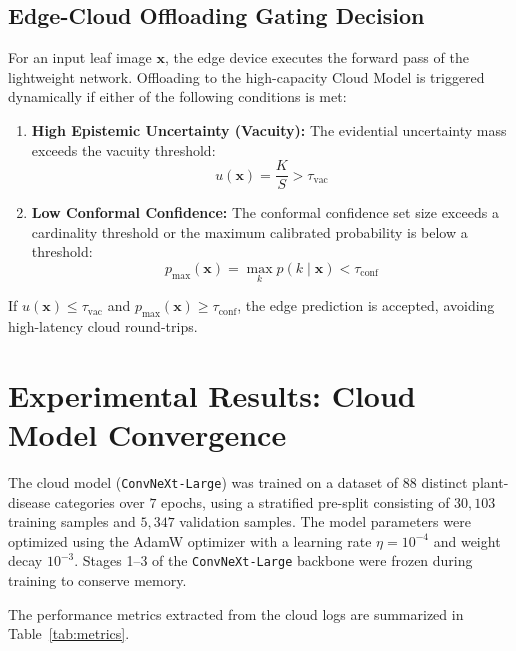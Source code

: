\documentclass[11pt,journal,onecolumn]{IEEEtran}
\begin{document}
\subsection{Edge-Cloud Offloading Gating Decision}
For an input leaf image $\mathbf{x}$, the edge device executes the forward pass of the lightweight network. Offloading to the high-capacity Cloud Model is triggered dynamically if either of the following conditions is met:
\begin{enumerate}
    \item \textbf{High Epistemic Uncertainty (Vacuity):} The evidential uncertainty mass exceeds the vacuity threshold:
    \begin{equation}
        u(\mathbf{x}) = \frac{K}{S} > \tau_{\text{vac}}
    \end{equation}
    \item \textbf{Low Conformal Confidence:} The conformal confidence set size exceeds a cardinality threshold or the maximum calibrated probability is below a threshold:
    \begin{equation}
        p_{\max}(\mathbf{x}) = \max_k p(k \mid \mathbf{x}) < \tau_{\text{conf}}
    \end{equation}
\end{enumerate}
If $u(\mathbf{x}) \le \tau_{\text{vac}}$ and $p_{\max}(\mathbf{x}) \ge \tau_{\text{conf}}$, the edge prediction is accepted, avoiding high-latency cloud round-trips.

\section{Experimental Results: Cloud Model Convergence}
The cloud model (\texttt{ConvNeXt-Large}) was trained on a dataset of $88$ distinct plant-disease categories over $7$ epochs, using a stratified pre-split consisting of $30,103$ training samples and $5,347$ validation samples. The model parameters were optimized using the AdamW optimizer with a learning rate $\eta = 10^{-4}$ and weight decay $10^{-3}$. Stages 1--3 of the \texttt{ConvNeXt-Large} backbone were frozen during training to conserve memory.

The performance metrics extracted from the cloud logs are summarized in Table~\ref{tab:metrics}.
\end{document}
